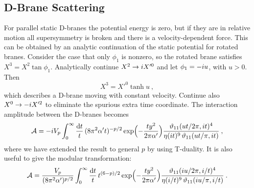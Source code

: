 \subsection*{D-Brane Scattering}

For parallel static D-branes the potential energy is zero, but if they are in relative motion all supersymmetry is broken and there is a velocity-dependent force. This can be obtained by an analytic continuation of the static potential for rotated branes. Consider the case that only $\phi_1$ is nonzero, so the rotated brane satisfies $X^3 = X^2\tan\phi_1$. Analytically continue $X^2 \to i X'^0$ and let $\phi_1 = -i u$, with $u > 0$. Then
\begin{equation}
	X^3 = X'^0\tanh u \:, \label{13.5.1}
\end{equation}
which describes a D-brane moving with constant velocity. Continue also $X^0 \to -i X'^2$ to eliminate the spurious extra time coordinate. The interaction amplitude between the D-branes becomes
\begin{equation}
	\mathcal{A} = -i V_p\int_0^\infty \frac{\mathrm{d} t}{t}\,(8\pi^2\alpha' t)^{-p/2}\exp\Bigl(-\frac{t y^2}{2\pi\alpha'}\Bigr)\frac{\vartheta_{11}(ut/2\pi, i t)^4}{\eta(i t)^9\,\vartheta_{11}(ut/\pi, i t)} \:, \label{13.5.2}
\end{equation}
where we have extended the result to general $p$ by using T-duality. It is also useful to give the modular transformation:
\begin{equation}
	\mathcal{A} = \frac{V_p}{(8\pi^2\alpha')^{p/2}}\int_0^\infty \frac{\mathrm{d} t}{t}\,t^{(6-p)/2}\exp\Bigl(-\frac{t y^2}{2\pi\alpha'}\Bigr)\frac{\vartheta_{11}(i u/2\pi, i/t)^4}{\eta(i/t)^9\,\vartheta_{11}(i u/\pi, i/t)} \:. \label{13.5.3}
\end{equation}
